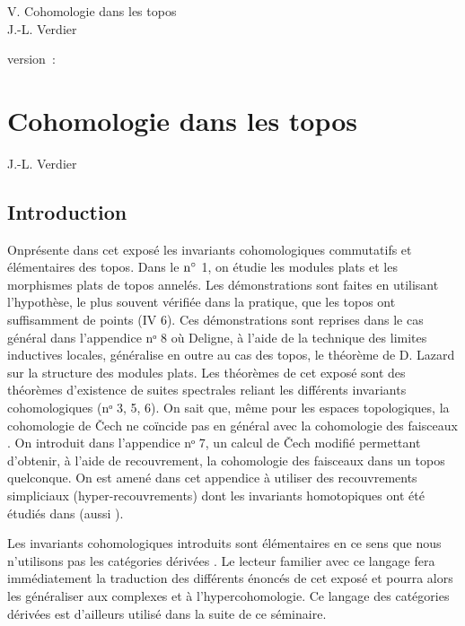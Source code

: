 \documentclass[10pt]{../fichiers-configuration-latex/smfart}
\begin{document}
\begin{center}
V. Cohomologie dans les topos\\
J.-L. Verdier
\end{center}

version : \showgitstatus{}
\tableofcontents

\else
\chapter{Cohomologie dans les topos}
\begin{center}
J.-L. Verdier
\end{center}
\fi

\setcounter{pageoriginal}{1}

\section*{Introduction}

On\pageoriginale présente dans cet exposé les invariants
cohomologiques commutatifs et élémentaires des topos. Dans le ${\rm
n^{\circ}}$ 1, on étudie les modules plats et les morphismes plats
de topos annelés. Les démonstrations sont faites en utilisant
l'hypothèse, le plus souvent vérifiée dans la pratique, que les
topos ont suffisamment de points (IV 6). Ces démonstrations sont
reprises dans le cas général dans l'appendice nᵒ 8
où Deligne, à l'aide de la technique des limites inductives
locales, généralise en outre au cas des topos, le théorème de D.
Lazard sur la structure des modules plats. Les théorèmes de cet
exposé\sisi{,}{} sont des théorèmes d'existence de suites spectrales reliant
les différents invariants cohomologiques (nᵒ 3, 5, 6). On
sait que, même pour les espaces topologiques, la cohomologie de Čech
ne coïncide pas en général avec la cohomologie des faisceaux
\cite{SGA4-05:11}. On introduit dans l'appendice nᵒ 7, un
calcul de Čech modifié permettant d'obtenir, à l'aide de
recouvrement, la cohomologie des faisceaux dans un topos quelconque.
On est amené dans cet appendice à utiliser des recouvrements
simpliciaux (hyper-recouvrements) dont les invariants homotopiques
ont été étudiés dans \cite{SGA4-05:1} (\cf aussi \cite{SGA4-05:17}).

Les invariants cohomologiques introduits sont élémentaires en ce
sens que nous n'utilisons pas les catégories dérivées \cite{SGA4-05:12}. Le
lecteur familier avec ce langage fera immédiatement la traduction
des différents énoncés de cet exposé et pourra alors les
généraliser aux complexes et à l'hypercohomologie. Ce langage des
catégories dérivées est d'ailleurs utilisé dans la suite de ce
séminaire.
\end{document}
